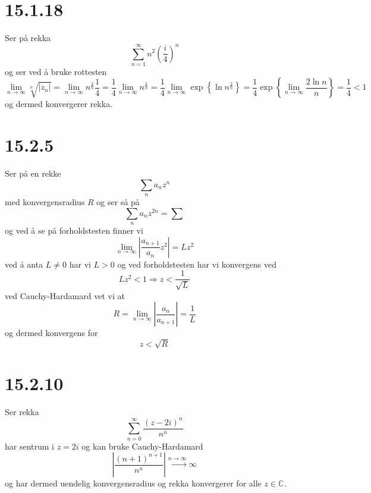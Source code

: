 \documentclass{report}
\newcommand{\M}[2]{\mathbb{#1}^{#2}}
\newcommand{\nbrack}[1]{\left( #1 \right)}
\newcommand{\cbrack}[1]{\left\lbrace #1 \right\rbrace}
\newcommand{\limtoinf}[1]{\lim_{#1 \rightarrow \infty}}
\begin{document}
\section*{15.1.18}
Ser på rekka
\begin{equation}
  \label{eq:21}
  \sum_{n=1}^{\infty} n^{2} \nbrack{ \frac{i}{4} }^{n}
\end{equation}
og ser ved å bruke rottesten
\begin{equation}
  \label{eq:22}
  \lim_{n \rightarrow \infty} \sqrt[n]{|z_{n}|} = \lim_{n \rightarrow \infty} n^{\frac{2}{n}} \frac{1}{4} = \frac{1}{4} \lim_{n \rightarrow \infty} n^{\frac{2}{n}} = \frac{1}{4} \lim_{n \rightarrow \infty} \exp \cbrack{\ln n^{\frac{2}{n}}} = \frac{1}{4} \exp \cbrack{ \lim_{n \rightarrow \infty} \frac{2 \ln n}{n} } = \frac{1}{4} < 1
\end{equation}
og dermed konvergerer rekka.


\section*{15.2.5}
Ser på en rekke
\begin{equation}
  \label{eq:23}
  \sum_{n} a_{n} z^{n}
\end{equation}
med konvergensradius $R$ og ser så på
\begin{equation}
  \label{eq:24}
  \sum_{n} a_{n} z^{2n} = \sum
\end{equation}
og ved å se på forholdstesten finner vi
\begin{equation}
  \label{eq:26}
  \limtoinf{n} \left| \frac{a_{n+1}}{a_{n}}z^{2} \right| = L z^{2}
\end{equation}
ved å anta $L\neq 0$ har vi $L > 0$ og ved forholdstesten har vi konvergens ved
\begin{equation}
  \label{eq:27}
  Lz^{2} < 1 \Rightarrow z < \frac{1}{\sqrt{L}}
\end{equation}
ved Cauchy-Hardamard vet vi at
\begin{equation}
  \label{eq:28}
  R = \limtoinf{n} \left| \frac{a_{n}}{a_{n+1}} \right| = \frac{1}{L}
\end{equation}
og dermed konvergens for
\begin{equation}
  \label{eq:29}
  z < \sqrt{R}
\end{equation}


\section*{15.2.10}
Ser rekka
\begin{equation}
  \label{eq:30}
  \sum_{n=0}^{\infty} \frac{(z - 2i)^{n}}{n^{n}}
\end{equation}
har sentrum i $z = 2i$ og kan bruke Cauchy-Hardamard
\begin{equation}
  \label{eq:31}
  \left| \frac{(n+1)^{n+1}}{n^{n}} \right| \xrightarrow{n \to \infty} \infty
\end{equation}
og har dermed uendelig konvergensradius og rekka konvergerer for alle $z \in \M{C}{}$.
\end{document}
